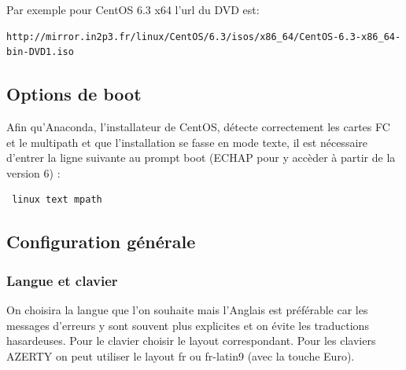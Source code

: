 \documentclass[a4paper,oneside]{report}
\begin{document}
\noindent Par exemple pour CentOS 6.3 x64 l'url du DVD est:
\begin{verbatim}
http://mirror.in2p3.fr/linux/CentOS/6.3/isos/x86_64/CentOS-6.3-x86_64-bin-DVD1.iso
\end{verbatim}

\subsection{Options de boot}
Afin qu'Anaconda, l'installateur de CentOS, détecte correctement les cartes FC et le multipath et que l'installation se fasse en mode texte, il est nécessaire d'entrer la ligne suivante au prompt boot (ECHAP pour y accèder à partir de la version 6) :
\begin{verbatim} linux text mpath \end{verbatim}

\subsection{Configuration générale}
\subsubsection{Langue et clavier}
On choisira la langue que l'on souhaite mais l'Anglais est préférable car les messages d'erreurs y sont souvent plus explicites et on évite les traductions hasardeuses.\newline
Pour le clavier choisir le layout correspondant. Pour les claviers AZERTY on peut utiliser le layout fr ou fr-latin9 (avec la touche Euro).
\end{document}
